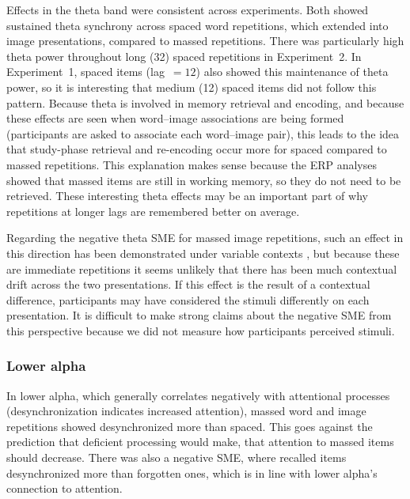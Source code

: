 Effects in the theta band were consistent across experiments.  Both showed sustained theta synchrony across spaced word repetitions, which extended into image presentations, compared to massed repetitions.  There was particularly high theta power throughout long (32) spaced repetitions in Experiment~2.  In Experiment~1, spaced items (lag~$=12$) also showed this maintenance of theta power, so it is interesting that medium (12) spaced items did not follow this pattern.  Because theta is involved in memory retrieval and encoding, and because these effects are seen when word--image associations are being formed (participants are asked to associate each word--image pair), this leads to the idea that study-phase retrieval and re-encoding occur more for spaced compared to massed repetitions.  This explanation makes sense because the ERP analyses showed that massed items are still in working memory, so they do not need to be retrieved.
These interesting theta effects may be an important part of why repetitions at longer lags are remembered better on average.



Regarding the negative theta SME for massed image repetitions, such an effect in this direction has been demonstrated under variable contexts \cite{StauHans2013}, but because these are immediate repetitions it seems unlikely that there has been much contextual drift across the two presentations.  If this effect is the result of a contextual difference, participants may have considered the stimuli differently on each presentation.  It is difficult to make strong claims about the negative SME from this perspective because we did not measure how participants perceived stimuli.

\subsubsection{Lower alpha}

In lower alpha, which generally correlates negatively with attentional processes (desynchronization indicates increased attention), massed word and image repetitions showed desynchronized more than spaced.  This goes against the prediction that deficient processing would make, that attention to massed items should decrease.  There was also a negative SME, where recalled items desynchronized more than forgotten ones, which is in line with lower alpha's connection to attention.

